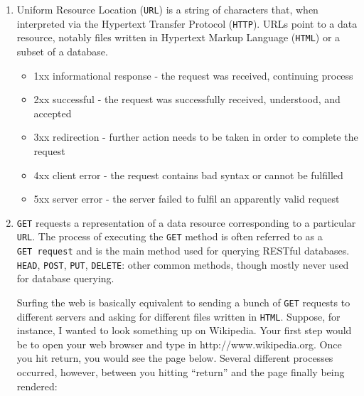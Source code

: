 \documentclass[
  letterpaper,
  DIV=11,
  numbers=noendperiod]{scrreprt}
\providecommand{\tightlist}{%
  \setlength{\itemsep}{0pt}\setlength{\parskip}{0pt}}\usepackage{longtable,booktabs,array}
\begin{document}
\begin{enumerate}
\def\labelenumi{\arabic{enumi}.}
\item
  Uniform Resource Location (\texttt{URL}) is a string of characters
  that, when interpreted via the Hypertext Transfer Protocol
  (\texttt{HTTP}). URLs point to a data resource, notably files written
  in Hypertext Markup Language (\texttt{HTML}) or a subset of a
  database.

  \begin{itemize}
  \tightlist
  \item
    1xx informational response - the request was received, continuing
    process
  \item
    2xx successful - the request was successfully received, understood,
    and accepted
  \item
    3xx redirection - further action needs to be taken in order to
    complete the request
  \item
    4xx client error - the request contains bad syntax or cannot be
    fulfilled
  \item
    5xx server error - the server failed to fulfil an apparently valid
    request
  \end{itemize}
\item
  \texttt{GET} requests a representation of a data resource
  corresponding to a particular \texttt{URL}. The process of executing
  the \texttt{GET} method is often referred to as a
  \texttt{GET\ request} and is the main method used for querying RESTful
  databases. \texttt{HEAD}, \texttt{POST}, \texttt{PUT},
  \texttt{DELETE}: other common methods, though mostly never used for
  database querying.

  Surfing the web is basically equivalent to sending a bunch of
  \texttt{GET} requests to different servers and asking for different
  files written in \texttt{HTML}. Suppose, for instance, I wanted to
  look something up on Wikipedia. Your first step would be to open your
  web browser and type in http://www.wikipedia.org. Once you hit return,
  you would see the page below. Several different processes occurred,
  however, between you hitting ``return'' and the page finally being
  rendered:


\end{enumerate}
\end{document}
